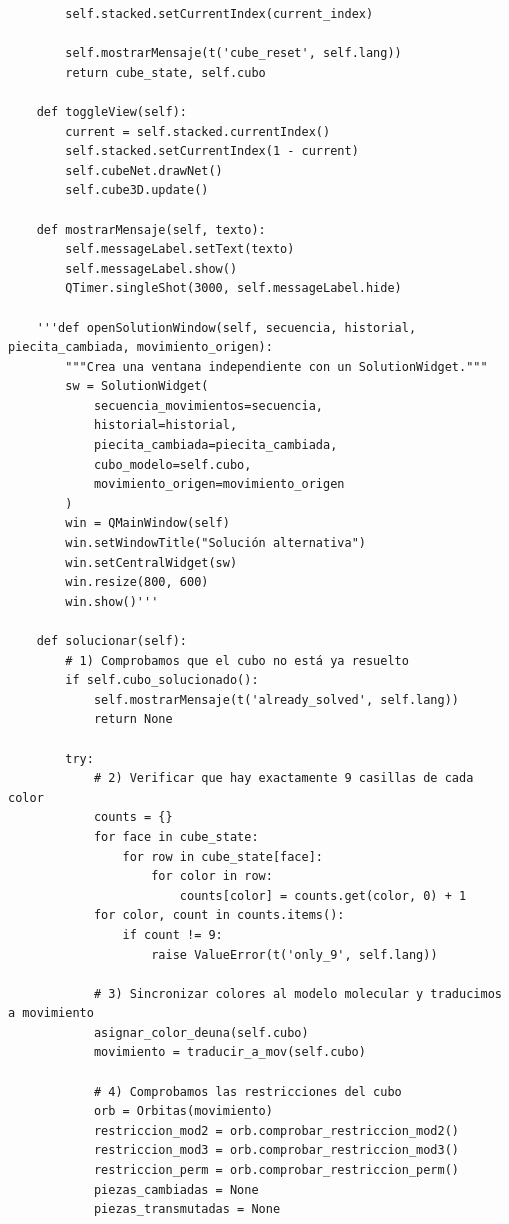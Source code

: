 \begin{lstlisting}
        self.stacked.setCurrentIndex(current_index) 

        self.mostrarMensaje(t('cube_reset', self.lang))
        return cube_state, self.cubo

    def toggleView(self):
        current = self.stacked.currentIndex()
        self.stacked.setCurrentIndex(1 - current)
        self.cubeNet.drawNet()
        self.cube3D.update()
    
    def mostrarMensaje(self, texto):
        self.messageLabel.setText(texto)
        self.messageLabel.show()
        QTimer.singleShot(3000, self.messageLabel.hide)
        
    '''def openSolutionWindow(self, secuencia, historial, piecita_cambiada, movimiento_origen):
        """Crea una ventana independiente con un SolutionWidget."""
        sw = SolutionWidget(
            secuencia_movimientos=secuencia,
            historial=historial,
            piecita_cambiada=piecita_cambiada,
            cubo_modelo=self.cubo,
            movimiento_origen=movimiento_origen
        )
        win = QMainWindow(self)
        win.setWindowTitle("Solución alternativa")
        win.setCentralWidget(sw)
        win.resize(800, 600)
        win.show()'''

    def solucionar(self):
        # 1) Comprobamos que el cubo no está ya resuelto
        if self.cubo_solucionado():
            self.mostrarMensaje(t('already_solved', self.lang))
            return None

        try:
            # 2) Verificar que hay exactamente 9 casillas de cada color
            counts = {}
            for face in cube_state:
                for row in cube_state[face]:
                    for color in row:
                        counts[color] = counts.get(color, 0) + 1
            for color, count in counts.items():
                if count != 9:
                    raise ValueError(t('only_9', self.lang))

            # 3) Sincronizar colores al modelo molecular y traducimos a movimiento
            asignar_color_deuna(self.cubo)
            movimiento = traducir_a_mov(self.cubo)

            # 4) Comprobamos las restricciones del cubo
            orb = Orbitas(movimiento)
            restriccion_mod2 = orb.comprobar_restriccion_mod2()
            restriccion_mod3 = orb.comprobar_restriccion_mod3()
            restriccion_perm = orb.comprobar_restriccion_perm()
            piezas_cambiadas = None
            piezas_transmutadas = None
            

\end{lstlisting}
